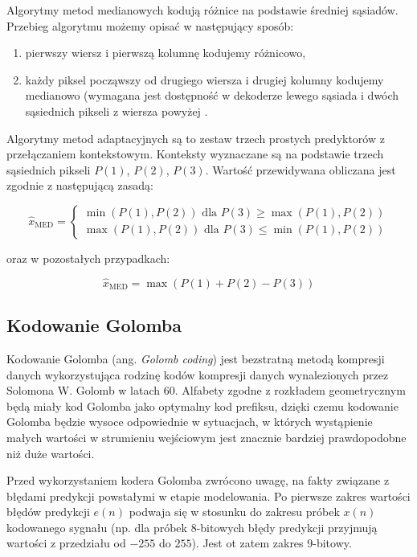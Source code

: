 \documentclass{article}
\begin{document}
Algorytmy metod medianowych kodują różnice na podstawie średniej sąsiadów. Przebieg algorytmu możemy opisać w następujący sposób:
\begin{enumerate}
 \item pierwszy wiersz i pierwszą kolumnę kodujemy różnicowo,
 \item każdy piksel począwszy od drugiego wiersza i drugiej kolumny kodujemy medianowo (wymagana jest dostępność w dekoderze lewego sąsiada i dwóch sąsiednich pikseli z wiersza powyżej \cite{differential_coding}.
\end{enumerate}


Algorytmy metod adaptacyjnych są to zestaw trzech prostych predyktorów z przełączaniem kontekstowym. Konteksty wyznaczane są na podstawie trzech sąsiednich pikseli $P(1)$, $P(2)$, $P(3)$. Wartość przewidywana obliczana jest zgodnie z następującą zasadą:


\begin{equation}
\hat{x}_{\mathrm{MED}}=\left\{\begin{array}{l}
\min (P(1), P(2)) \text{ dla } P(3) \geq \max(P(1), P(2)) \\
\max (P(1), P(2)) \text{ dla } P(3) \leq \min(P(1), P(2))
\end{array}\right.
\end{equation}

oraz w pozostałych przypadkach: 


\begin{equation}
\hat{x}_{\mathrm{MED}}= \max(P(1) + P(2) - P(3))
\end{equation}

\subsection{Kodowanie Golomba}
\label{sec:golomb}

Kodowanie Golomba (ang. \emph{Golomb coding}) jest bezstratną metodą kompresji danych wykorzystująca rodzinę kodów kompresji danych wynalezionych przez Solomona W. Golomb w latach 60. Alfabety zgodne z rozkładem geometrycznym będą miały kod Golomba jako optymalny kod prefiksu, dzięki czemu kodowanie Golomba będzie wysoce odpowiednie w sytuacjach, w których wystąpienie małych wartości w strumieniu wejściowym jest znacznie bardziej prawdopodobne niż duże wartości.

Przed wykorzystaniem kodera Golomba zwrócono uwagę, na fakty związane z błędami predykcji powstałymi w etapie modelowania. Po pierwsze zakres wartości błędów predykcji $e(n)$ podwaja się w stosunku do zakresu próbek $x(n)$ kodowanego sygnału (np. dla próbek 8-bitowych błędy predykcji przyjmują wartości z przedziału od $-255$ do $255$). Jest ot zatem zakres 9-bitowy.
\end{document}
